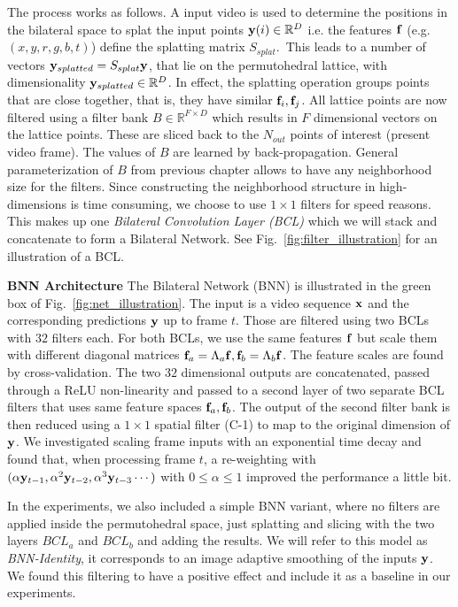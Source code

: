 The process works as follows.
A input video is used to determine the positions in the bilateral space to splat the input points
$\mathbf{y}(i)\in\mathbb{R}^D$ i.e. the features $\mathbf{f}$ (e.g. $(x,y,r,g,b,t)$) define the splatting matrix $S_{splat}$.~This leads to a number of vectors $\mathbf{y}_{splatted} = S_{splat}\mathbf{y}$, that lie on the permutohedral lattice, with dimensionality $\mathbf{y}_{splatted}\in\mathbb{R}^D$.
In effect, the splatting operation groups points that are close together, that is, they have similar $\mathbf{f}_i,\mathbf{f}_j$.
All lattice points are now filtered using a filter bank $B\in\mathbb{R}^{F\times D}$ which results in $F$ dimensional vectors on the lattice points.
These are sliced back to the $N_{out}$ points of interest (present video frame).
The values of $B$ are learned by back-propagation.
General parameterization of $B$ from previous chapter allows to have
any neighborhood size for the filters. Since constructing the neighborhood structure in
high-dimensions is time consuming, we choose to use $1 \times 1$ filters for speed reasons.
This makes up one \emph{Bilateral Convolution Layer (BCL)} which we will stack and concatenate to form a Bilateral Network. See Fig.~\ref{fig:filter_illustration} for an illustration of a BCL.

{\bf BNN Architecture} The Bilateral Network (BNN) is illustrated in the green box of
Fig.~\ref{fig:net_illustration}.
The input is a video sequence $\mathbf{x}$ and the corresponding predictions $\mathbf{y}$ up to frame
$t$. Those are filtered using two BCLs with $32$ filters each.
For both BCLs, we use the same features $\mathbf{f}$ but scale them with different diagonal matrices
$\mathbf{f}_a=\Lambda_a\mathbf{f},\mathbf{f}_b=\Lambda_b\mathbf{f}$. The feature scales are found by cross-validation.
The two $32$ dimensional outputs are concatenated, passed through a ReLU non-linearity and passed to a
second layer of two separate BCL filters that uses same feature spaces $\mathbf{f}_a,\mathbf{f}_b$.
The output of the second filter bank is then reduced using a $1\times 1$ spatial filter (C-1) to map to
the original dimension of $\mathbf{y}$.
We investigated scaling frame inputs with an exponential time decay and found that, when processing
frame $t$, a re-weighting with $(\alpha \mathbf{y}_{t-1}, \alpha^2 \mathbf{y}_{t-2}, \alpha^3 \mathbf{y}_{t-3} \cdots)$ with
$0\le\alpha\le 1$ improved the performance a little bit.

In the experiments, we also included a simple BNN variant,
where no filters are applied inside the permutohedral space, just splatting and slicing
with the two layers $BCL_a$ and $BCL_b$ and adding the results.
We will refer to this model as \emph{BNN-Identity},
it corresponds to an image adaptive smoothing of the inputs $\mathbf{y}$.
We found this filtering to have a positive effect and include it as a baseline in our experiments.


